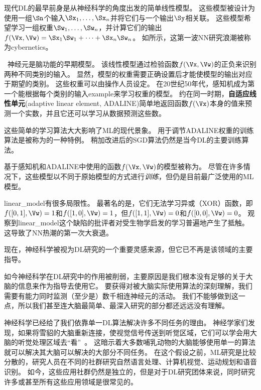  
现代\gls{DL}的最早前身是从神经科学的角度出发的简单线性模型。
这些模型被设计为使用一组$\Sn$个输入$\Sx_1, \dots ,\Sx_n$并将它们与一个输出$\Sy$相关联。 
这些模型希望学习一组权重$\Sw_1, \dots, \Sw_n $，并计算它们的输出$f(\Vx, \Vw) = \Sx_1 \Sw_1 + \dots + \Sx_n \Sw_n$。
如所示，这第一波\gls{NN}研究浪潮被称为\gls{cybernetics}。

~神经元\citep{McCulloch43}是脑功能的早期模型。
该线性模型通过检验函数$f(\Vx,\Vw)$的正负来识别两种不同类别的输入。
显然，模型的权重需要正确设置后才能使模型的输出对应于期望的类别。
这些权重可以由操作人员设定。
在20世纪50年代，感知机\citep{Rosenblatt-1958,Rosenblatt-1962}成为第一个能根据每个类别的输入\gls{example}来学习权重的模型。
约在同一时期，\textbf{自适应线性单元}(adaptive linear element, ADALINE)简单地返回函数$f(\Vx)$本身的值来预测一个实数\citep{Widrow60}，并且它还可以学习从数据预测这些数。

这些简单的学习算法大大影响了\gls{ML}的现代景象。
用于调节ADALINE权重的训练算法是被称为的一种特例。
稍加改进后的\gls{SGD}算法仍然是当今\gls{DL}的主要训练算法。

基于感知机和ADALINE中使用的函数$f(\Vx, \Vw)$的模型被称为。
尽管在许多情况下，这些模型以不同于原始模型的方式进行\emph{训练}，但仍是目前最广泛使用的\gls{ML}模型。

\gls{linear_model}有很多局限性。
最著名的是，它们无法学习异或（XOR）函数，即$f([0,1], \Vw) = 1$和$f([1,0], \Vw)=1$，但$f([1,1], \Vw)=0$和$f([0,0],\Vw)= 0$。
观察到\gls{linear_model}这个缺陷的批评者对受生物学启发的学习普遍地产生了抵触\citep{Minsky69}。
这导致了\gls{NN}热潮的第一次大衰退。

现在，神经科学被视为\gls{DL}研究的一个重要灵感来源，但它已不再是该领域的主要指导。


如今神经科学在\gls{DL}研究中的作用被削弱，主要原因是我们根本没有足够的关于大脑的信息来作为指导去使用它。
要获得对被大脑实际使用算法的深刻理解，我们需要有能力同时监测（至少是）数千相连神经元的活动。
我们不能够做到这一点，所以我们甚至连大脑最简单、最深入研究的部分都还远远没有理解\citep{olshausen:2005}。

神经科学已经给了我们依靠单一\gls{DL}算法解决许多不同任务的理由。
神经学家们发现，如果将雪貂的大脑重新连接，使视觉信号传送到听觉区域，它们可以学会用大脑的听觉处理区域去``看''~\citep{von2000visual}。
这暗示着大多数哺乳动物的大脑能够使用单一的算法就可以解决其大脑可以解决的大部分不同任务。
在这个假设之前，\gls{ML}研究是比较分散的，研究人员在不同的社群研究自然语言处理、计算机视觉、运动规划和语音识别。
如今，这些应用社群仍然是独立的，但是对于\gls{DL}研究团体来说，同时研究许多或甚至所有这些应用领域是很常见的。

